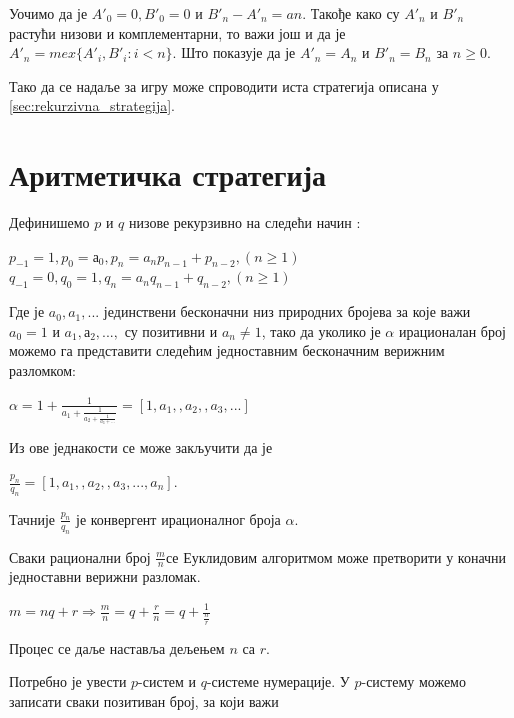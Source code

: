 \documentclass[a4paper]{article}
\begin{document}
Уочимо да је $ A'_{0} = 0, B'_{0} = 0 $ и $ B'_{n} - A'_{n} = an $. Такође како су $ A'_{n} $ и $ B'_{n} $ растући низови и комплементарни, то важи још и да је $ A'_{n} = mex \{ A'_{i}, B'_{i} : i < n \} $. Што показује да је $ A'_{n} = A_{n} $ и $ B'_{n} = B_{n}  $ за $ n \ge 0 $.

Тако да се надаље за игру може спроводити иста стратегија описана у \ref{sec:rekurzivna_strategija}. 

\section{Аритметичка стратегија}
\label{sec:aritmeticka_strategija}

Дефинишемо $ p $ и $ q $ низове рекурзивно на следећи начин :

\begin{center}
	$ p_{-1} = 1, p_{0} = а_{0}, p_{n} = a_{n}p_{n-1} + p_{n-2}, (n \geq 1 ) $\\
	$ q_{-1} = 0, q_{0} = 1, q_{n} = a_{n}q_{n-1} + q_{n-2}, (n \geq 1 ) $
\end{center}

Где је $ a_{0}, a_{1}, ... $ јединствени бесконачни низ природних бројева за које важи $ a_{0} = 1 $ и $ a_{1}, а_{2}, ... ,  $ су позитивни и $ a_{n} \ne 1 $, тако да уколико је $ \alpha $ ирационалан број можемо га представити следећим једноставним бесконачним верижним разломком:

\begin{center}
		$ \alpha = 1 + \frac{1}{a_{1} + \frac{1}{a_{2} + \frac{1}{a_{3} + ...}}} = [1, a_{1}, , a_{2}, , a_{3}, ...] $ 
\end{center}

Из ове једнакости се може закључити да је 
\begin{center}
	$ \frac{p_{n}}{q_{n}} = [1, a_{1}, , a_{2}, , a_{3}, ..., a_{n}] $.
\end{center}

Тачније $ \frac{p_{n}}{q_{n}} $ је конвергент ирационалног броја $ \alpha $. 

Сваки рационални број $ \frac{m}{n} $се Еуклидовим алгоритмом може претворити у коначни једноставни верижни разломак.

\begin{center}
	$ m = nq + r \Rightarrow
	  \frac{m}{n} = q + \frac{r}{n} = q + \frac{1}{\frac{n}{r}} $
\end{center}
Процес се даље наставља дељењем $ n $ са $ r $.

Потребно је увести $ p $-систем и $ q $-системе нумерације. 
У $ p $-систему можемо записати сваки позитиван број, за који важи 
\end{document}
